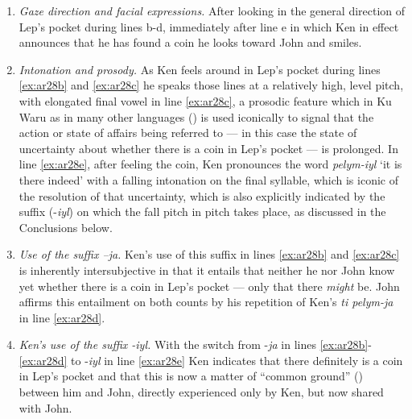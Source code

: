 \documentclass[output=paper]{langsci/langscibook}
\begin{document}
\begin{enumerate}
	\item \emph{Gaze direction and facial expressions.} After looking in the general direction of Lep’s pocket during lines b-d, immediately after line e in which Ken in effect announces that he has found a coin he looks toward John and smiles. 
	\item \emph{Intonation and prosody.} As Ken feels around in Lep’s pocket during lines \ref{ex:ar28b} and \ref{ex:ar28c} he speaks those lines at a relatively high, level pitch, with elongated final vowel in line  \ref{ex:ar28c}, a prosodic feature which in Ku Waru as in many other languages (\citealt{Tedlock1983}) is used iconically to signal that the action or state of affairs being referred to — in this case the state of uncertainty about whether there is a coin in Lep’s pocket — is prolonged. In line  \ref{ex:ar28e}, after feeling the coin, Ken pronounces the word \textit{pelym-iyl} ‘it is there indeed’ with a falling intonation on the final syllable, which is iconic of the resolution of that uncertainty, which is also explicitly indicated by the suffix (-\textit{iyl}) on which the fall pitch in pitch takes place, as discussed in the Conclusions below.  
	\item \emph{Use of the suffix –\textit{ja}.} Ken’s use of this suffix in lines  \ref{ex:ar28b} and  \ref{ex:ar28c} is inherently intersubjective in that it entails that neither he nor John know yet whether there is a coin in Lep’s pocket — only that there \emph{might} be. John affirms this entailment on both counts by his repetition of Ken’s \textit{ti pelym-ja} in line  \ref{ex:ar28d}.
	\item \emph{Ken’s use of the suffix -\textit{iyl}.}  With the switch from -\textit{ja} in lines  \ref{ex:ar28b}- \ref{ex:ar28d} to -\textit{iyl} in line  \ref{ex:ar28e} Ken indicates that there definitely is a coin in Lep’s pocket and that this is now a matter of  “common ground” (\citealt{Clark1996}) between him and John, directly experienced only by Ken, but now shared with John.

\end{enumerate}
\end{document}
